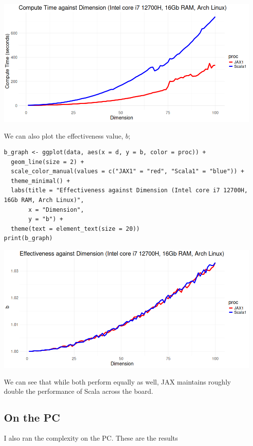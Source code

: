 \documentclass[letterpaper]{article}
\begin{document}
\begin{center}
\includegraphics[width=.9\linewidth]{Figures/plot_complexity_laptop_1.png}
\label{org8f6f955}
\end{center}

We can also plot the effectiveness value, \(b\);

\begin{verbatim}
b_graph <- ggplot(data, aes(x = d, y = b, color = proc)) +
  geom_line(size = 2) +
  scale_color_manual(values = c("JAX1" = "red", "Scala1" = "blue")) +
  theme_minimal() + 
  labs(title = "Effectiveness against Dimension (Intel core i7 12700H, 16Gb RAM, Arch Linux)",
       x = "Dimension",
       y = "b") +
  theme(text = element_text(size = 20))
print(b_graph)
\end{verbatim}

\begin{center}
\includegraphics[width=.9\linewidth]{Figures/plot_b_laptop.png}
\label{orgfa43065}
\end{center}

We can see that while both perform equally as well, JAX maintains roughly double the performance of Scala across the board.
\subsection{On the PC}
\label{sec:orgb4dec37}

I also ran the complexity on the PC. These are the results
\end{document}
